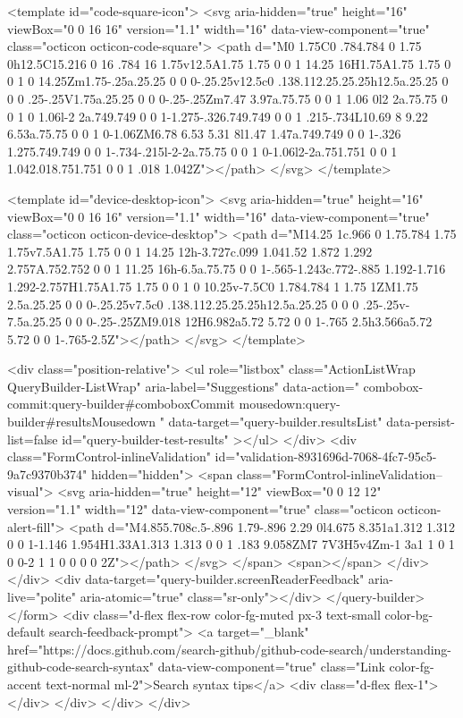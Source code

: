 <template id="code-square-icon">
  <svg aria-hidden="true" height="16" viewBox="0 0 16 16" version="1.1" width="16" data-view-component="true" class="octicon octicon-code-square">
    <path d="M0 1.75C0 .784.784 0 1.75 0h12.5C15.216 0 16 .784 16 1.75v12.5A1.75 1.75 0 0 1 14.25 16H1.75A1.75 1.75 0 0 1 0 14.25Zm1.75-.25a.25.25 0 0 0-.25.25v12.5c0 .138.112.25.25.25h12.5a.25.25 0 0 0 .25-.25V1.75a.25.25 0 0 0-.25-.25Zm7.47 3.97a.75.75 0 0 1 1.06 0l2 2a.75.75 0 0 1 0 1.06l-2 2a.749.749 0 0 1-1.275-.326.749.749 0 0 1 .215-.734L10.69 8 9.22 6.53a.75.75 0 0 1 0-1.06ZM6.78 6.53 5.31 8l1.47 1.47a.749.749 0 0 1-.326 1.275.749.749 0 0 1-.734-.215l-2-2a.75.75 0 0 1 0-1.06l2-2a.751.751 0 0 1 1.042.018.751.751 0 0 1 .018 1.042Z"></path>
</svg>
</template>

<template id="device-desktop-icon">
  <svg aria-hidden="true" height="16" viewBox="0 0 16 16" version="1.1" width="16" data-view-component="true" class="octicon octicon-device-desktop">
    <path d="M14.25 1c.966 0 1.75.784 1.75 1.75v7.5A1.75 1.75 0 0 1 14.25 12h-3.727c.099 1.041.52 1.872 1.292 2.757A.752.752 0 0 1 11.25 16h-6.5a.75.75 0 0 1-.565-1.243c.772-.885 1.192-1.716 1.292-2.757H1.75A1.75 1.75 0 0 1 0 10.25v-7.5C0 1.784.784 1 1.75 1ZM1.75 2.5a.25.25 0 0 0-.25.25v7.5c0 .138.112.25.25.25h12.5a.25.25 0 0 0 .25-.25v-7.5a.25.25 0 0 0-.25-.25ZM9.018 12H6.982a5.72 5.72 0 0 1-.765 2.5h3.566a5.72 5.72 0 0 1-.765-2.5Z"></path>
</svg>
</template>

        <div class="position-relative">
                <ul
                  role="listbox"
                  class="ActionListWrap QueryBuilder-ListWrap"
                  aria-label="Suggestions"
                  data-action="
                    combobox-commit:query-builder#comboboxCommit
                    mousedown:query-builder#resultsMousedown
                  "
                  data-target="query-builder.resultsList"
                  data-persist-list=false
                  id="query-builder-test-results"
                ></ul>
        </div>
      <div class="FormControl-inlineValidation" id="validation-8931696d-7068-4fc7-95c5-9a7c9370b374" hidden="hidden">
        <span class="FormControl-inlineValidation--visual">
          <svg aria-hidden="true" height="12" viewBox="0 0 12 12" version="1.1" width="12" data-view-component="true" class="octicon octicon-alert-fill">
    <path d="M4.855.708c.5-.896 1.79-.896 2.29 0l4.675 8.351a1.312 1.312 0 0 1-1.146 1.954H1.33A1.313 1.313 0 0 1 .183 9.058ZM7 7V3H5v4Zm-1 3a1 1 0 1 0 0-2 1 1 0 0 0 0 2Z"></path>
</svg>
        </span>
        <span></span>
</div>    </div>
    <div data-target="query-builder.screenReaderFeedback" aria-live="polite" aria-atomic="true" class="sr-only"></div>
</query-builder></form>
          <div class="d-flex flex-row color-fg-muted px-3 text-small color-bg-default search-feedback-prompt">
            <a target="_blank" href="https://docs.github.com/search-github/github-code-search/understanding-github-code-search-syntax" data-view-component="true" class="Link color-fg-accent text-normal ml-2">Search syntax tips</a>            <div class="d-flex flex-1"></div>
          </div>
        </div>
</div>

